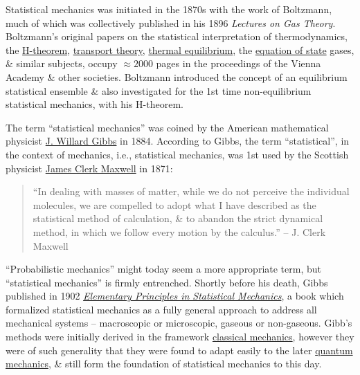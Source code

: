 \documentclass{article}
\begin{document}
Statistical mechanics was initiated in the 1870s with the work of {\sc Boltzmann}, much of which was collectively published in his 1896 {\it Lectures on Gas Theory}. {\sc Boltzmann}'s original papers on the statistical interpretation of thermodynamics, the \href{https://en.wikipedia.org/wiki/H-theorem}{H-theorem}, \href{https://en.wikipedia.org/wiki/Transport_theory_(statistical_physics)}{transport theory}, \href{https://en.wikipedia.org/wiki/Thermal_equilibrium}{thermal equilibrium}, the \href{https://en.wikipedia.org/wiki/Equation_of_state}{equation of state} gases, \& similar subjects, occupy $\approx2000$ pages in the proceedings of the Vienna Academy \& other societies. {\sc Boltzmann} introduced the concept of an equilibrium statistical ensemble \& also investigated for the 1st time non-equilibrium statistical mechanics, with his H-theorem.

The term ``statistical mechanics'' was coined by the American mathematical physicist \href{https://en.wikipedia.org/wiki/Josiah_Willard_Gibbs}{\sc J. Willard Gibbs} in 1884. According to {\sc Gibbs}, the term ``statistical'', in the context of mechanics, i.e., statistical mechanics, was 1st used by the Scottish physicist \href{https://en.wikipedia.org/wiki/James_Clerk_Maxwell}{\sc James Clerk Maxwell} in 1871:
\begin{quote}
	``In dealing with masses of matter, while we do not perceive the individual molecules, we are compelled to adopt what I have described as the statistical method of calculation, \& to abandon the strict dynamical method, in which we follow every motion by the calculus.'' -- {\sc J. Clerk Maxwell}
\end{quote}
``Probabilistic mechanics'' might today seem a more appropriate term, but ``statistical mechanics'' is firmly entrenched. Shortly before his death, {\sc Gibbs} published in 1902 \href{https://en.wikipedia.org/wiki/Elementary_Principles_in_Statistical_Mechanics}{\it Elementary Principles in Statistical Mechanics}, a book which formalized statistical mechanics as a fully general approach to address all mechanical systems -- macroscopic or microscopic, gaseous or non-gaseous. {\sc Gibb}'s methods were initially derived in the framework \href{https://en.wikipedia.org/wiki/Classical_mechanics}{classical mechanics}, however they were of such generality that they were found to adapt easily to the later \href{https://en.wikipedia.org/wiki/Quantum_mechanics}{quantum mechanics}, \& still form the foundation of statistical mechanics to this day.
\end{document}
